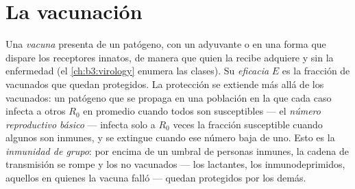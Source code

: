 \section{La vacunación}

\begin{definition}\label{def:b3:adaptive-immunity:vaccine}
Una \emph{vacuna} presenta  de un patógeno, con un adyuvante o
en una forma que dispare los receptores innatos, de manera que quien la
recibe adquiere  y  sin la enfermedad (el
\cref{ch:b3:virology} enumera las clases). Su \emph{eficacia} $E$ es la
fracción de vacunados que quedan protegidos. La protección se extiende
más allá de los vacunados: un patógeno que se propaga en una población en
la que cada caso infecta a otros $R_{0}$ en promedio cuando todos son
susceptibles --- el \emph{número reproductivo básico} --- infecta solo a
$R_{0}$ veces la fracción susceptible cuando algunos son inmunes, y se
extingue cuando ese número baja de uno. Esto es la \emph{inmunidad de
grupo}: por encima de un umbral de personas inmunes, la cadena de
transmisión se rompe y los no vacunados --- los lactantes, los
inmunodeprimidos, aquellos en quienes la vacuna falló --- quedan
protegidos por los demás.
\end{definition}

